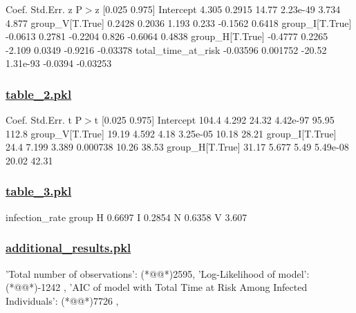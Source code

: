 \documentclass[11pt]{article}
\begin{document}
\begin{codeoutput}
                      Coef.  Std.Err.       z     P$>$\textbar{}z\textbar{}  [0.025   0.975]
Intercept             4.305    0.2915   14.77  2.23e-49   3.734    4.877
group\_V[T.True]      0.2428    0.2036   1.193     0.233 -0.1562   0.6418
group\_I[T.True]     -0.0613    0.2781 -0.2204     0.826 -0.6064   0.4838
group\_H[T.True]     -0.4777    0.2265  -2.109    0.0349 -0.9216 -0.03378
total\_time\_at\_risk -0.03596  0.001752  -20.52  1.31e-93 -0.0394 -0.03253
\end{codeoutput}\hypertarget{file-table-2-pkl}{}

\subsubsection*{\hyperlink{code-Data Analysis-table-2-pkl}{table\_2.pkl}}

\begin{codeoutput}
                 Coef.  Std.Err.     t     P$>$\textbar{}t\textbar{}  [0.025  0.975]
Intercept        104.4     4.292 24.32  4.42e-97   95.95   112.8
group\_V[T.True]  19.19     4.592  4.18  3.25e-05   10.18   28.21
group\_I[T.True]   24.4     7.199 3.389  0.000738   10.26   38.53
group\_H[T.True]  31.17     5.677  5.49  5.49e-08   20.02   42.31
\end{codeoutput}\hypertarget{file-table-3-pkl}{}

\subsubsection*{\hyperlink{code-Data Analysis-table-3-pkl}{table\_3.pkl}}

\begin{codeoutput}
       infection\_rate
group                
H              0.6697
I              0.2854
N              0.6358
V               3.607
\end{codeoutput}\hypertarget{file-additional-results-pkl}{}

\subsubsection*{\hyperlink{code-Data Analysis-additional-results-pkl}{additional\_results.pkl}}

\begin{codeoutput}
{
    'Total number of observations': (*@@*)2595,
    'Log-Likelihood of model': (*@@*)-1242            ,
    'AIC of model with Total Time at Risk Among Infected Individuals': (*@@*)7726             ,
}
\end{codeoutput}
\end{document}
